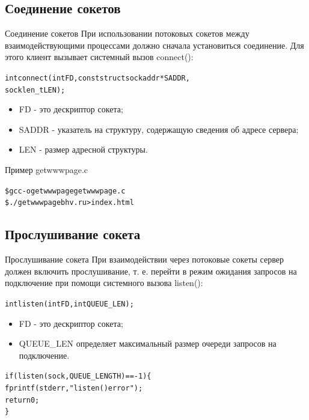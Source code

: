 \documentclass{beamer}
\begin{document}
\subsection{Соединение сокетов}

\begin{frame}[fragile]{Соединение сокетов}
	При использовании потоковых сокетов между взаимодействующими процессами должно сначала установиться соединение.
	Для этого клиент вызывает системный вызов connect():
	\begin{alltt}
		int connect (int FD, const struct sockaddr * SADDR,
                     socklen_t LEN);
	\end{alltt}
	\begin{itemize}
		\item FD - это дескриптор сокета;
		\item SADDR - указатель на структуру, содержащую сведения об адресе сервера;
		\item LEN - размер адресной структуры.		
	\end{itemize}
	Пример getwwwpage.c
	\begin{alltt}
		\$ gcc -o getwwwpage getwwwpage.c
		\$ ./getwwwpage bhv.ru > index.html
	\end{alltt}	
\end{frame}

\subsection{Прослушивание сокета}

\begin{frame}[fragile]{Прослушивание сокета}
	При взаимодействии через потоковые сокеты сервер должен включить прослушивание, т. е. перейти в режим ожидания запросов на подключение при помощи системного вызова listen():
	\begin{alltt}
		int listen (int FD, int QUEUE_LEN);
	\end{alltt}
	\begin{itemize}
		\item FD - это дескриптор сокета;
		\item QUEUE\_LEN определяет максимальный размер очереди запросов на подключение.
	\end{itemize}
	\begin{alltt}
		if (listen (sock, QUEUE_LENGTH) == -1) \{
		    fprintf (stderr, "listen() error");
		    return 0;
		\}
	\end{alltt}
\end{frame}
\end{document}
